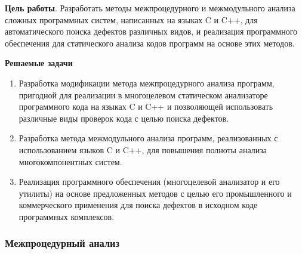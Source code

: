 \documentclass[hyperref={pdfpagelabels=false},10pt,gray]{beamer}
\begin{document}
\begin{frame}
\textbf{\Large{Цель работы}}. Разработать методы межпроцедурного и межмодульного анализа сложных программных систем, написанных на языках C и C++, для автоматического поиска дефектов различных видов, и реализация программного обеспечения для статического анализа кодов программ на основе этих методов.

\vspace{5pt}
\textbf{\Large{Решаемые задачи}}

\begin{enumerate}
  \item Разработка модификации метода межпроцедурного анализа программ, пригодной для реализации в многоцелевом статическом анализаторе программного кода на языках C и C++ и позволяющей использовать различные виды проверок кода с целью поиска дефектов.
  \item Разработка метода межмодульного анализа программ, реализованных с использованием языков C и C++, для повышения полноты анализа многокомпонентных систем.
  \item Реализация программного обеспечения (многоцелевой анализатор и его утилиты) на основе предложенных методов с целью его промышленного и коммерческого применения для поиска дефектов в исходном коде программных комплексов.
\end{enumerate}

\end{frame}


\begin{frame}
\frametitle{Межпроцедурный анализ}
\begin{figure}[h]
\end{figure}
\end{frame}
\end{document}
